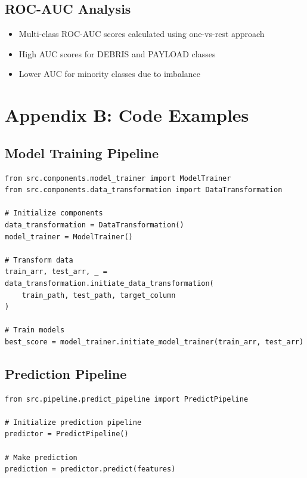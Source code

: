 \documentclass[12pt,a4paper]{article}
\begin{document}
\subsection*{ROC-AUC Analysis}
\begin{itemize}
    \item Multi-class ROC-AUC scores calculated using one-vs-rest approach
    \item High AUC scores for DEBRIS and PAYLOAD classes
    \item Lower AUC for minority classes due to imbalance
\end{itemize}

\section*{Appendix B: Code Examples}

\subsection*{Model Training Pipeline}
\begin{lstlisting}
from src.components.model_trainer import ModelTrainer
from src.components.data_transformation import DataTransformation

# Initialize components
data_transformation = DataTransformation()
model_trainer = ModelTrainer()

# Transform data
train_arr, test_arr, _ = data_transformation.initiate_data_transformation(
    train_path, test_path, target_column
)

# Train models
best_score = model_trainer.initiate_model_trainer(train_arr, test_arr)
\end{lstlisting}

\subsection*{Prediction Pipeline}
\begin{lstlisting}
from src.pipeline.predict_pipeline import PredictPipeline

# Initialize prediction pipeline
predictor = PredictPipeline()

# Make prediction
prediction = predictor.predict(features)
\end{lstlisting}
\end{document}
